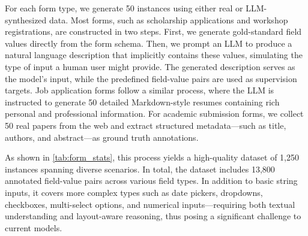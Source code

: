 \documentclass[sigconf, screen, review]{acmart}
\begin{document}
For each form type, we generate 50 instances using either real or LLM-synthesized data.
Most forms, such as scholarship applications and workshop registrations, are constructed in two steps.
First, we generate gold-standard field values directly from the form schema.
Then, we prompt an LLM to produce a natural language description that implicitly contains these values, simulating the type of input a human user might provide.
The generated description serves as the model’s input, while the predefined field-value pairs are used as supervision targets.
Job application forms follow a similar process, where the LLM is instructed to generate 50 detailed Markdown-style resumes containing rich personal and professional information.
For academic submission forms, we collect 50 real papers from the web and extract structured metadata—such as title, authors, and abstract—as ground truth annotations.

As shown in \cref{tab:form_stats}, this process yields a high-quality dataset of 1,250 instances spanning diverse scenarios. In total, the dataset includes 13,800 annotated field-value pairs across various field types. In addition to basic string inputs, it covers more complex types such as date pickers, dropdowns, checkboxes, multi-select options, and numerical inputs—requiring both textual understanding and layout-aware reasoning, thus posing a significant challenge to current models.



\end{document}
